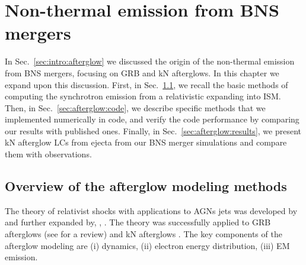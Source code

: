 
\chapter{Non-thermal emission from \ac{BNS} mergers} \label{ch:afterglow} 


In Sec.~\ref{sec:intro:afterglow} we discussed the origin of 
the non-thermal emission from \ac{BNS} mergers, focusing on 
\ac{GRB} and \ac{kN} afterglows. 
%
In this chapter we expand upon this discussion. First, in 
Sec.~\ref{sec:intro:afterglow_modelling}, we recall the basic methods 
of computing the synchrotron emission from a relativistic \blast{} 
expanding into \ac{ISM}. 
%
Then, in Sec.~\ref{sec:afterglow:code}, we describe specific methods 
that we implemented numerically in \pyblast{} code, and verify the 
code performance by comparing our results with published ones. 
%
Finally, in Sec.~\ref{sec:afterglow:results}, we present 
\ac{kN} afterglow \acp{LC} from ejecta from our \ac{BNS} merger 
simulations and compare them with observations. 



\section{Overview of the afterglow modeling methods}\label{sec:intro:afterglow_modelling}

The theory of relativist shocks with applications to \acp{AGN} jets was 
developed by \citet{Blandford:1976} 
and further expanded by, \eg, \citet{vanEerten:2011bf,Nava:2013,Peer:2012}. 
The theory was successfully applied to \ac{GRB} afterglows 
\citep[\eg][]{Costa:1997cg,vanParadijs:1997wr,Lamb:2017ych}
(see \citet{Kumar:2014upa} for a review) 
and \ac{kN} afterglows \citep[\eg][]{Nakar:2011cw,Hotokezaka:2015eja,Hotokezaka:2018gmo}.
%
%
%
The key components of the afterglow modeling are (i) \blast{} dynamics, 
(ii) electron energy distribution, (iii) \ac{EM} emission. 



